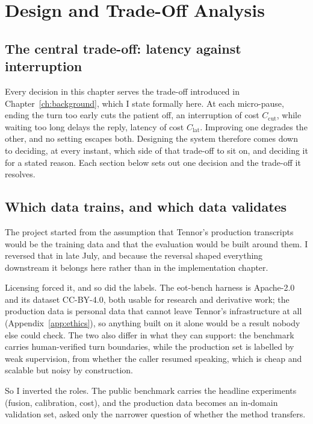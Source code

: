 \chapter{Design and Trade-Off Analysis}
\label{ch:approach}

\section{The central trade-off: latency against interruption}
\label{sec:tradeoff}

Every decision in this chapter serves the trade-off introduced in
Chapter~\ref{ch:background}, which I state formally here. At each micro-pause, ending the
turn too early cuts the patient off, an interruption of cost $C_{\mathrm{cut}}$, while
waiting too long delays the reply, latency of cost $C_{\mathrm{lat}}$. Improving one
degrades the other, and no setting escapes both. Designing the system therefore comes down to deciding, at every instant, which side of that
trade-off to sit on, and deciding it for a stated reason. Each section below sets out one decision and the
trade-off it resolves.

\section{Which data trains, and which data validates}
\label{sec:datastrategy}

The project started from the assumption that Tennor's production transcripts would be the
training data and that the evaluation would be built around them. I reversed that in late
July, and because the reversal shaped everything downstream it belongs here rather than in
the implementation chapter.

Licensing forced it, and so did the labels. The eot-bench harness is Apache-2.0 and its
dataset CC-BY-4.0, both usable for research and derivative work; the production data is
personal data that cannot leave Tennor's infrastructure at all
(Appendix~\ref{app:ethics}), so anything built on it alone would be a result nobody else
could check. The two also differ in what they can support: the benchmark carries
human-verified turn boundaries, while the production set is labelled by weak supervision,
from whether the caller resumed speaking, which is cheap and scalable but noisy by
construction.

So I inverted the roles. The public benchmark carries the headline experiments (fusion,
calibration, cost), and the production data becomes an in-domain validation set, asked
only the narrower question of whether the method transfers.

